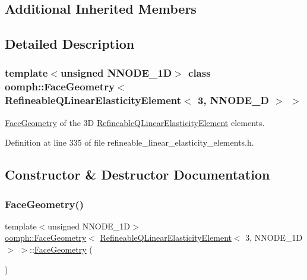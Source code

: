 \subsection*{Additional Inherited Members}


\subsection{Detailed Description}
\subsubsection*{template$<$unsigned N\+N\+O\+D\+E\+\_\+1D$>$\newline
class oomph\+::\+Face\+Geometry$<$ Refineable\+Q\+Linear\+Elasticity\+Element$<$ 3, N\+N\+O\+D\+E\+\_\+D $>$ $>$}

\hyperlink{classoomph_1_1FaceGeometry}{Face\+Geometry} of the 3D \hyperlink{classoomph_1_1RefineableQLinearElasticityElement}{Refineable\+Q\+Linear\+Elasticity\+Element} elements. 

Definition at line 335 of file refineable\+\_\+linear\+\_\+elasticity\+\_\+elements.\+h.



\subsection{Constructor \& Destructor Documentation}
\mbox{\label{classoomph_1_1FaceGeometry_3_01RefineableQLinearElasticityElement_3_013_00_01NNODE__1D_01_4_01_4_a0538785e2b249c6444a96aa003cd2dc7}} 
\subsubsection{\texorpdfstring{Face\+Geometry()}{FaceGeometry()}}
{\footnotesize\ttfamily template$<$unsigned N\+N\+O\+D\+E\+\_\+1D$>$ \\
\hyperlink{classoomph_1_1FaceGeometry}{oomph\+::\+Face\+Geometry}$<$ \hyperlink{classoomph_1_1RefineableQLinearElasticityElement}{Refineable\+Q\+Linear\+Elasticity\+Element}$<$ 3, N\+N\+O\+D\+E\+\_\+1D $>$ $>$\+::\hyperlink{classoomph_1_1FaceGeometry}{Face\+Geometry} (\begin{DoxyParamCaption}{ }\end{DoxyParamCaption})\hspace{0.3cm}{\ttfamily [inline]}}



